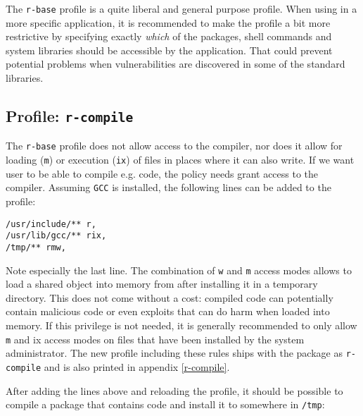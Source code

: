 The \texttt{r-base} profile is a quite liberal and general purpose profile.
When using \AppArmor in a more specific application, it is recommended to make
the profile a bit more restrictive by specifying exactly \emph{which} of the
packages, shell commands and system libraries should be accessible by the
application. That could prevent potential problems when vulnerabilities are
discovered in some of the standard libraries.

\subsection{Profile: \texttt{r-compile}}

The \texttt{r-base} profile does not allow access to the compiler, nor does it
allow for loading (\texttt{m}) or execution (\texttt{ix}) of files in places
where it can also write. If we want user to be able to compile e.g. \Cpp code,
the policy needs grant access to the compiler. Assuming \texttt{GCC} is
installed, the following lines can be added to the profile:

\begin{verbatim}
/usr/include/** r,
/usr/lib/gcc/** rix,
/tmp/** rmw,
\end{verbatim}

Note especially the last line. The combination of \texttt{w} and \texttt{m}
access modes allows \R to load a shared object into memory from after
installing it in a temporary directory. This does not come without a cost:
compiled code can potentially contain malicious code or even exploits that can
do harm when loaded into memory. If this privilege is not needed, it is
generally recommended to only allow \texttt{m} and {ix} access modes on files
that have been installed by the system administrator. The new profile including
these rules ships with the package as \texttt{r-compile} and is also printed in
appendix \ref{r-compile}.

After adding the lines above and reloading the profile, it should be possible to
compile a package that contains \Cpp code and install it to somewhere
in \texttt{/tmp}:

\begin{knitrout}\mycodesize
{}\color{fgcolor}\begin{kframe}
\begin{alltt}
\hlstd{(}\hlstd{(}\hlstd{,}  \hlstd{=} \hlstd{()),} 
   \hlstd{=} \hlstd{)}
\end{alltt}
\end{kframe}
\end{knitrout}


